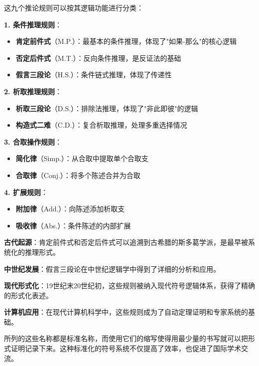 \begin{theorembox}[title=推论规则的分类与特征]
这九个推论规则可以按其逻辑功能进行分类：

\textbf{1. 条件推理规则}：
\begin{itemize}
\item \textbf{肯定前件式}（M.P.）：最基本的条件推理，体现了"如果-那么"的核心逻辑
\item \textbf{否定后件式}（M.T.）：反向条件推理，是反证法的基础
\item \textbf{假言三段论}（H.S.）：条件链式推理，体现了传递性
\end{itemize}

\textbf{2. 析取推理规则}：
\begin{itemize}
\item \textbf{析取三段论}（D.S.）：排除法推理，体现了"非此即彼"的逻辑
\item \textbf{构造式二难}（C.D.）：复合析取推理，处理多重选择情况
\end{itemize}

\textbf{3. 合取操作规则}：
\begin{itemize}
\item \textbf{简化律}（Simp.）：从合取中提取单个合取支
\item \textbf{合取律}（Conj.）：将多个陈述合并为合取
\end{itemize}

\textbf{4. 扩展规则}：
\begin{itemize}
\item \textbf{附加律}（Add.）：向陈述添加析取支
\item \textbf{吸收律}（Abs.）：条件陈述的内部扩展
\end{itemize}
\end{theorembox}

\begin{examplebox}[title=推论规则的历史发展]
\textbf{古代起源}：肯定前件式和否定后件式可以追溯到古希腊的斯多葛学派，是最早被系统化的推理形式。

\textbf{中世纪发展}：假言三段论在中世纪逻辑学中得到了详细的分析和应用。

\textbf{现代形式化}：19世纪末20世纪初，这些规则被纳入现代符号逻辑体系，获得了精确的形式化表述。

\textbf{计算机应用}：在现代计算机科学中，这些规则成为了自动定理证明和专家系统的基础。
\end{examplebox}

所列的这些名称都是标准名称，而使用它们的缩写使得用最少量的书写就可以把形式证明记录下来。这种标准化的符号系统不仅提高了效率，也促进了国际学术交流。

